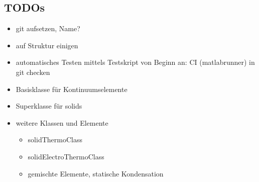 \documentclass{scrarticle}
\begin{document}
      \subsection*{TODOs}
      \begin{itemize}
      \item git aufsetzen, Name?
        \item auf Struktur einigen
      \item automatisches Testen mittels Testskript von Beginn an: CI (matlabrunner) in git checken
      \item Basisklasse f\"ur Kontinuumselemente
      \item Superklasse f\"ur solids
      \item weitere Klassen und Elemente
        \begin{itemize}
        \item solidThermoClass
        \item solidElectroThermoClass
        \item gemischte Elemente, statische Kondensation
        \end{itemize}
      \end{itemize}
\end{document}
